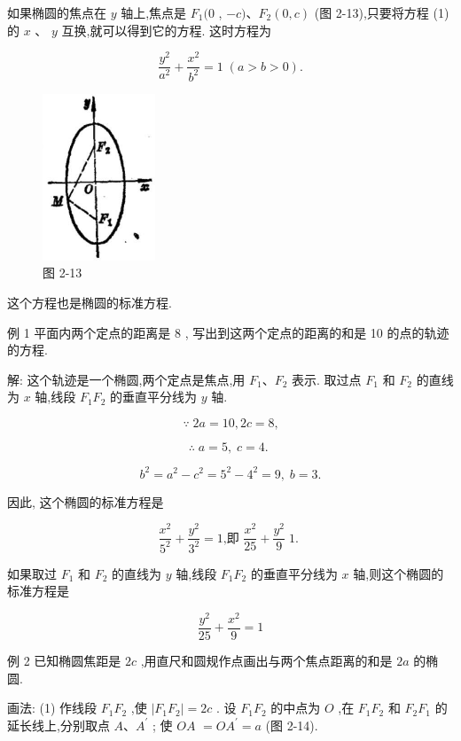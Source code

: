 \documentclass[lang=cn,newtx,10pt,scheme=chinese]{elegantbook}
\begin{document}
如果椭圆的焦点在 \(y\) 轴上,焦点是 \({F}_{1}(0\) , \(- c)\text{、}{F}_{2}\left( {0,c}\right)\) (图 2-13),只要将方程 (1) 的 \(x\) 、 \(y\) 互换,就可以得到它的方程. 这时方程为

\[
  \frac{{y}^{2}}{{a}^{2}} + \frac{{x}^{2}}{{b}^{2}} = 1\;\left( {a > b > 0}\right) .
\]

\begin{figure}[h]
  \centering
  \includegraphics[max width=0.3\textwidth]{images/01912cc2-ffb6-728e-9ae7-b113ff05c64b_88_686468.jpg}
  \caption{图 2-13}
\end{figure}



这个方程也是椭圆的标准方程.

例 1 平面内两个定点的距离是 8 , 写出到这两个定点的距离的和是 10 的点的轨迹的方程.

解: 这个轨迹是一个椭圆,两个定点是焦点,用 \({F}_{1}\text{、}{F}_{2}\) 表示. 取过点 \({F}_{1}\) 和 \({F}_{2}\) 的直线为 \(x\) 轴,线段 \({F}_{1}{F}_{2}\) 的垂直平分线为 \(y\) 轴.

\[
  \because \;{2a} = {10},{2c} = 8\text{,}
\]

\[
  \therefore \;a = 5,\;c = 4\text{. }
\]

\[
    {b}^{2} = {a}^{2} - {c}^{2} = {5}^{2} - {4}^{2} = 9,\;b = 3.
\]

因此, 这个椭圆的标准方程是

\[
  \frac{{x}^{2}}{{5}^{2}} + \frac{{y}^{2}}{{3}^{2}} = 1\text{,即 }\frac{{x}^{2}}{25} + \frac{{y}^{2}}{9}\;1\text{. }
\]

如果取过 \({F}_{1}\) 和 \({F}_{2}\) 的直线为 \(y\) 轴,线段 \({F}_{1}{F}_{2}\) 的垂直平分线为 \(x\) 轴,则这个椭圆的标准方程是

\[
  \frac{{y}^{2}}{25} + \frac{{x}^{2}}{9} = 1
\]

例 2 已知椭圆焦距是 \({2c}\) ,用直尺和圆规作点画出与两个焦点距离的和是 \({2a}\) 的椭圆.

画法: (1) 作线段 \({F}_{1}{F}_{2}\) ,使 \(\left| {{F}_{1}{F}_{2}}\right| = {2c}\) . 设 \({F}_{1}{F}_{2}\) 的中点为 \(O\) ,在 \({F}_{1}{F}_{2}\) 和 \({F}_{2}{F}_{1}\) 的延长线上,分别取点 \(A\text{、}{A}^{\prime }\) ; 使 \({OA}\) \(= O{A}^{\prime } = a\) (图 2-14).
\end{document}
